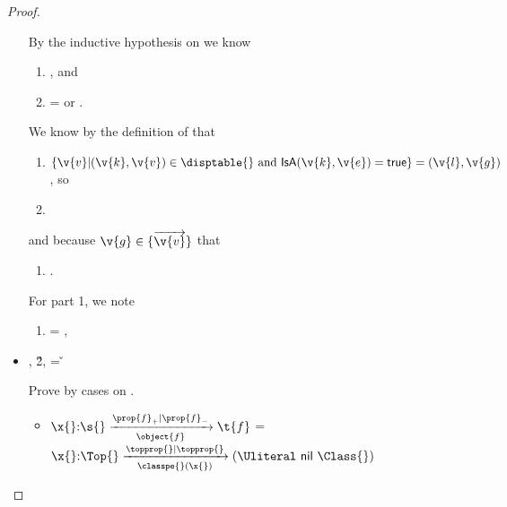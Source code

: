 \begin{lemma}
\begin{proof}
\begin{case}[T-App]
\begin{itemize}
\begin{subcase}[B-BetaMulti]
  By the inductive hypothesis on  we know 
  \begin{enumerate}[resume]
    \item {}, and
    \item {} = \emptyobject{} or .
  \end{enumerate}

  We know by the definition of \getmethodliteral that
  \begin{enumerate}[resume]
    \item $\{ \v{v} | {\roundpair{\v{k}}{\v{v}}} \in \disptable{} \text{ and } \isaopsem{\v{k}}{\v{e}} = {\true{}} \} = {\roundpair{\v{l}}{\v{g}}}$, so
    \item {}
  \end{enumerate}

  and because ${\v{g}} \in \{\overrightarrow{\v{v}}\}$
  that 
  \begin{enumerate}[resume]
    \item
  {}.
  \end{enumerate}

  For part 1, we note
  \begin{enumerate}[resume]
    \item
  \object{} = {
                           {}
                           {\x{}}},
  \end{enumerate}

\end{subcase}
  \item[]
\begin{subcase}[B-Delta]
  \opsem {\openv{}} {} {\const{}},
  \opsem {\openv{}} {} {\v{2}},
   = \v{}


  Prove by cases on \const{}.
  \begin{itemize}
    \item[] \begin{subcase}[\const{} = \classconst]
    ${\ArrowOne {\x{}} {\s{}}
                                                       {\t{f}}
                                                       {\filterset {\thenprop {\prop{f}}}
                                                                   {\elseprop {\prop{f}}}}
                                                       {\object{f}}}$
                                                       =
  ${\ArrowOne {\x{}} {\Top{}}
                                      {\Union{\nil{}}{\Class{}}}
                                      {\filterset {\topprop{}}
                                                  {\topprop{}}}
                                      {\path {\classpe{}} {\x{}}}}$


\end{subcase}
\end{itemize}
\end{subcase}
\end{itemize}
\end{case}
\end{proof}
\end{lemma}
